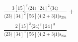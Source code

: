 \documentclass[varwidth, border=5pt]{standalone}
\begin{document}
\begin{my}
$\begin{gathered}
\scriptscriptstyle\frac{3[15]^2⟨24⟩[24]^2⟨34⟩}{⟨23⟩[34]^2[56]⟨4|2+3|1]s_{234}}+\\
\scriptscriptstyle\frac{2[15]^2⟨24⟩^2[24]^3}{⟨23⟩[34]^3[56]⟨4|2+3|1]s_{234}}\phantom{+}
\end{gathered}$
\end{my}
\end{document}
